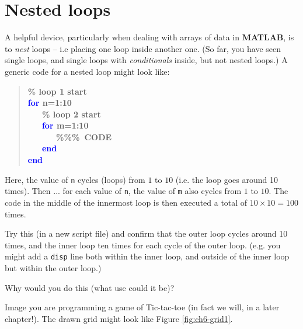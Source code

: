\documentclass{tufte-book} %
\newenvironment{docspecbold}{\begin{quotation}\ttfamily\bfseries\parskip0pt\parindent0pt\ignorespaces}{\end{quotation}}
\begin{document}
\newpage


\section{Nested loops}

A helpful device, particularly when dealing with arrays of data in \textbf{MATLAB}, is to \textit{nest} loops -- i.e placing one loop inside another one. (So far, you have seen single loops, and single loops with \textit{conditionals} inside, but not nested loops.) A generic code for a nested loop might look like:
\begin{docspecbold}
\textcolor[rgb]{0,0.501961,0}{\% loop 1 start\\}
\textcolor{blue}{for} n=1:10\\
\ \ \ \textcolor[rgb]{0,0.501961,0}{\% loop 2 start\\}
\ \ \ \textcolor{blue}{for} m=1:10\\
\ \ \ \ \ \ \textcolor[rgb]{0,0.501961,0}{\%\%\%\ CODE\\}
\ \ \ \textcolor{blue}{end}\\
\textcolor{blue}{end}
\end{docspecbold}
Here, the value of \texttt{n} cycles (loops) from \(1\) to \(10\) (i.e. the loop goes around 10 times). Then ... for each value of \texttt{n}, the value of \texttt{m} also cycles from \(1\) to \(10\). The code in the middle of the innermost loop is then executed a total of \(10\times 10=100\) times.

Try this (in a new script file) and confirm that the outer loop cycles around 10 times, and the inner loop ten times for each cycle of the outer loop. (e.g. you might add a \texttt{disp} line both within the inner loop, and outside of the inner loop but within the outer loop.)

Why would you do this (what use could it be)?

Image you are programming a game of Tic-tac-toe (in fact we will, in a later chapter!). The drawn grid might look like Figure \ref{fig:ch6-grid1}.
\end{document}
